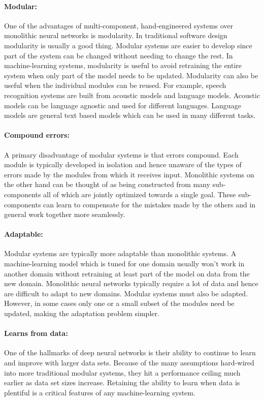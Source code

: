 \paragraph{Modular:} One of the advantages of multi-component, hand-engineered
systems over monolithic neural networks is modularity. In traditional software
design modularity is usually a good thing. Modular systems are easier to
develop since part of the system can be changed without needing to change the
rest. In machine-learning systems, modularity is useful to avoid retraining the
entire system when only part of the model needs to be updated. Modularity can
also be useful when the individual modules can be reused. For example, speech
recognition systems are built from acoustic models and language models.
Acoustic models can be language agnostic and used for different languages.
Language models are general text based models which can be used in many
different tasks.

\paragraph{Compound errors:} A primary disadvantage of modular systems is that
errors compound. Each module is typically developed in isolation and hence
unaware of the types of errors made by the modules from which it receives
input. Monolithic systems on the other hand can be thought of as being
constructed from many sub-components all of which are jointly optimized towards
a single goal. These sub-components can learn to compensate for the mistakes
made by the others and in general work together more seamlessly.

\paragraph{Adaptable:} Modular systems are typically more adaptable than
monolithic systems. A machine-learning model which is tuned for one domain
usually won't work in another domain without retraining at least part of the
model on data from the new domain. Monolithic neural networks typically require
a lot of data and hence are difficult to adapt to new domains. Modular systems
must also be adapted. However, in some cases only one or a small subset of the
modules need be updated, making the adaptation problem simpler.

\paragraph{Learns from data:} One of the hallmarks of deep neural networks is
their ability to continue to learn and improve with larger data sets. Because
of the many assumptions hard-wired into more traditional modular systems, they
hit a performance ceiling much earlier as data set sizes increase. Retaining
the ability to learn when data is plentiful is a critical features of any
machine-learning system.

